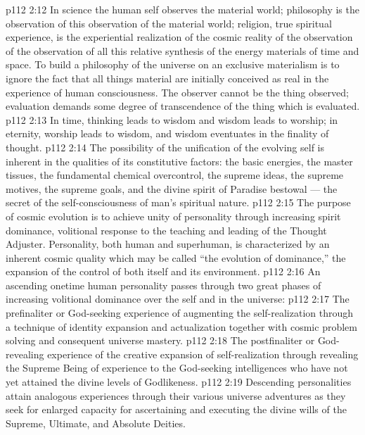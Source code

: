 \vs p112 2:12 In science the human self observes the material world; philosophy is the observation of this observation of the material world; religion, true spiritual experience, is the experiential realization of the cosmic reality of the observation of the observation of all this relative synthesis of the energy materials of time and space. To build a philosophy of the universe on an exclusive materialism is to ignore the fact that all things material are initially conceived as real in the experience of human consciousness. The observer cannot be the thing observed; evaluation demands some degree of transcendence of the thing which is evaluated.
\vs p112 2:13 In time, thinking leads to wisdom and wisdom leads to worship; in eternity, worship leads to wisdom, and wisdom eventuates in the finality of thought.
\vs p112 2:14 The possibility of the unification of the evolving self is inherent in the qualities of its constitutive factors: the basic energies, the master tissues, the fundamental chemical overcontrol, the supreme ideas, the supreme motives, the supreme goals, and the divine spirit of Paradise bestowal --- the secret of the self\hyp{}consciousness of man’s spiritual nature.
\vs p112 2:15 The purpose of cosmic evolution is to achieve unity of personality through increasing spirit dominance, volitional response to the teaching and leading of the Thought Adjuster. Personality, both human and superhuman, is characterized by an inherent cosmic quality which may be called “the evolution of dominance,” the expansion of the control of both itself and its environment.
\vs p112 2:16 \pc An ascending onetime human personality passes through two great phases of increasing volitional dominance over the self and in the universe:
\vs p112 2:17 \bibnobreakspace The prefinaliter or God\hyp{}seeking experience of augmenting the self\hyp{}realization through a technique of identity expansion and actualization together with cosmic problem solving and consequent universe mastery.
\vs p112 2:18 \bibnobreakspace The postfinaliter or God\hyp{}revealing experience of the creative expansion of self\hyp{}realization through revealing the Supreme Being of experience to the God\hyp{}seeking intelligences who have not yet attained the divine levels of Godlikeness.
\vs p112 2:19 \pc Descending personalities attain analogous experiences through their various universe adventures as they seek for enlarged capacity for ascertaining and executing the divine wills of the Supreme, Ultimate, and Absolute Deities.
